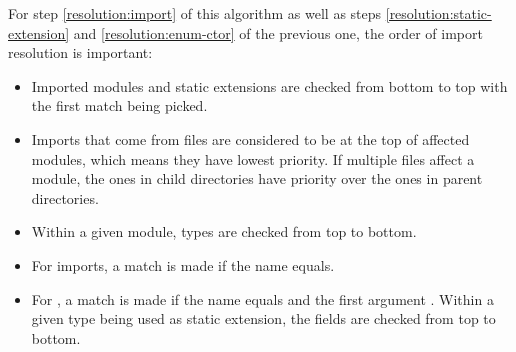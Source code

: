 For step \ref{resolution:import} of this algorithm as well as steps \ref{resolution:static-extension} and \ref{resolution:enum-ctor} of the previous one, the order of import resolution is important:

\begin{itemize}
	\item Imported modules and static extensions are checked from bottom to top with the first match being picked.
	\item Imports that come from  files are considered to be at the top of affected modules, which means they have lowest priority. If multiple  files affect a module, the ones in child directories have priority over the ones in parent directories.
	\item Within a given module, types are checked from top to bottom.
	\item For imports, a match is made if the name equals.
	\item For , a match is made if the name equals and the first argument . Within a given type being used as static extension, the fields are checked from top to bottom.
\end{itemize}
